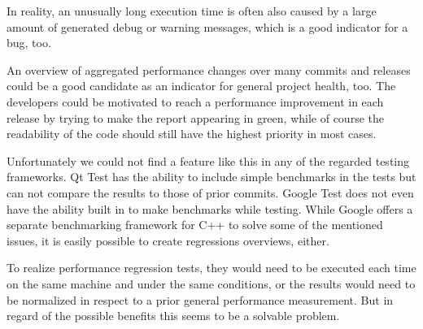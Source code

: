 \documentclass{scrreprt}
\begin{document}
In reality, an unusually long execution time is often also caused by a large amount of generated debug or warning messages, which is a good indicator for a bug, too.

An overview of aggregated performance changes over many commits and releases could be a good candidate as an indicator for general project health, too. The developers could be motivated to reach a performance improvement in each release by trying to make the report appearing in green, while of course the readability of the code should still have the highest priority in most cases.

Unfortunately we could not find a feature like this in any of the regarded testing frameworks. Qt Test has the ability to include simple benchmarks in the tests but can not compare the results to those of prior commits. Google Test does not even have the ability built in to make benchmarks while testing. While Google offers a separate benchmarking framework for C++ to solve some of the mentioned issues, it is easily possible to create regressions overviews, either.

To realize performance regression tests, they would need to be executed each time on the same machine and under the same conditions, or the results would need to be normalized in respect to a prior general performance measurement. But in regard of the possible benefits this seems to be a solvable problem.
\end{document}
